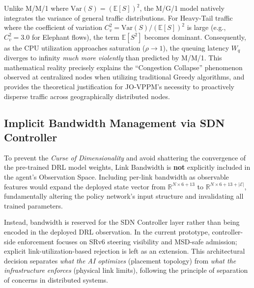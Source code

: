 \documentclass[12pt, a4paper, reqno, oneside]{book}
\begin{document}
Unlike M/M/1 where $\text{Var}(S) = (\mathbb{E}[S])^2$, the M/G/1 model natively integrates the variance of general traffic distributions. For Heavy-Tail traffic where the coefficient of variation $C_v^2 = \text{Var}(S)/(\mathbb{E}[S])^2$ is large (e.g., $C_v^2 = 3.0$ for Elephant flows), the term $\mathbb{E}[S^2]$ becomes dominant. Consequently, as the CPU utilization approaches saturation ($\rho \to 1$), the queuing latency $W_q$ diverges to infinity \textit{much more violently} than predicted by M/M/1. This mathematical reality precisely explains the ``Congestion Collapse'' phenomenon observed at centralized nodes when utilizing traditional Greedy algorithms, and provides the theoretical justification for JO-VPPM's necessity to proactively disperse traffic across geographically distributed nodes.

\subsection{Implicit Bandwidth Management via SDN Controller}
To prevent the \textit{Curse of Dimensionality} and avoid shattering the convergence of the pre-trained DRL model weights, Link Bandwidth is \textbf{not} explicitly included in the agent's Observation Space. Including per-link bandwidth as observable features would expand the deployed state vector from $\mathbb{R}^{N \times 6 + 13}$ to $\mathbb{R}^{N \times 6 + 13 + |\mathcal{E}|}$, fundamentally altering the policy network's input structure and invalidating all trained parameters.

Instead, bandwidth is reserved for the SDN Controller layer rather than being encoded in the deployed DRL observation. In the current prototype, controller-side enforcement focuses on SRv6 steering visibility and MSD-safe admission; explicit link-utilization-based rejection is left as an extension. This architectural decision separates \textit{what the AI optimizes} (placement topology) from \textit{what the infrastructure enforces} (physical link limits), following the principle of separation of concerns in distributed systems.
\end{document}

